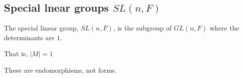 
\subsection{Special lnear groups \(SL(n, F)\)}

The special linear group, \(SL(n,F)\), is the subgroup of \(GL(n,F)\) where the determinants are \(1\).

That is, \(|M|=1\)

These are endomorphisms, not forms.

